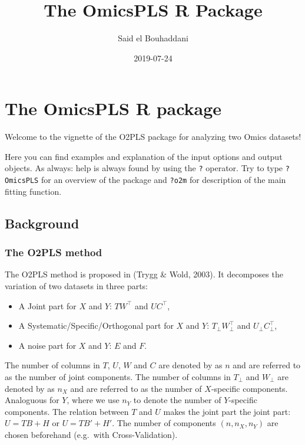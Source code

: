 \documentclass[]{article}
\title{The OmicsPLS R Package}
\author{Said el Bouhaddani}
\date{2019-07-24}
\providecommand{\tightlist}{%
  \setlength{\itemsep}{0pt}\setlength{\parskip}{0pt}}
\begin{document}
\maketitle

\hypertarget{the-omicspls-r-package}{%
\section{The OmicsPLS R package}\label{the-omicspls-r-package}}

Welcome to the vignette of the O2PLS package for analyzing two Omics
datasets!

Here you can find examples and explanation of the input options and
output objects. As always: help is always found by using the \texttt{?}
operator. Try to type \texttt{?OmicsPLS} for an overview of the package
and \texttt{?o2m} for description of the main fitting function.

\hypertarget{background}{%
\subsection{Background}\label{background}}

\hypertarget{the-o2pls-method}{%
\subsubsection{The O2PLS method}\label{the-o2pls-method}}

The O2PLS method is proposed in (Trygg \& Wold, 2003). It decomposes the
variation of two datasets in three parts:

\begin{itemize}
\tightlist
\item
  A Joint part for \(X\) and \(Y\): \(TW^\top\) and \(UC^\top\),
\item
  A Systematic/Specific/Orthogonal part for \(X\) and \(Y\):
  \(T_\perp W_\perp^\top\) and \(U_\perp C_\perp^\top\),
\item
  A noise part for \(X\) and \(Y\): \(E\) and \(F\).
\end{itemize}

The number of columns in \(T\), \(U\), \(W\) and \(C\) are denoted by as
\(n\) and are referred to as the number of joint components. The number
of columns in \(T_\perp\) and \(W_\perp\) are denoted by as \(n_X\) and
are referred to as the number of \(X\)-specific components. Analoguous
for \(Y\), where we use \(n_Y\) to denote the number of \(Y\)-specific
components. The relation between \(T\) and \(U\) makes the joint part
the joint part: \(U = TB + H\) or \(U = TB'+ H'\). The number of
components \((n, n_X, n_Y)\) are chosen beforehand (e.g.~with
Cross-Validation).
\end{document}
